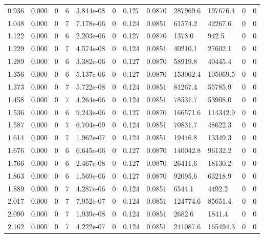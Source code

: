 \documentclass[preview]{standalone}
\begin{document}
{{\begin{tabular}{L{1.2cm}C{1.2cm} C{0.3cm}C{0.5cm} C{1.4cm}C{1.4cm} C{1.4cm}C{1.4cm} C{1.6cm}C{1.6cm} C{1.6cm}C{1.6cm}}
  0.936  &  0.000  & 0     &  6 &  3.844e-08  & 0  &  0.127&   0.0870& 287969.6 & 197676.4   &  0 & 0  \\ 
  1.048  &  0.000  & 0     &  7 &  7.178e-06  & 0  &  0.124&   0.0851& 61574.2 & 42267.6   &  0 & 0  \\ 
  1.122  &  0.000  & 0     &  6 &  2.203e-06  & 0  &  0.127&   0.0870& 1373.0 & 942.5   &  0 & 0  \\ 
  1.229  &  0.000  & 0     &  7 &  4.574e-08  & 0  &  0.124&   0.0851& 40210.1 & 27602.1   &  0 & 0  \\ 
  1.289  &  0.000  & 0     &  6 &  3.382e-06  & 0  &  0.127&   0.0870& 58919.8 & 40445.4   &  0 & 0  \\ 
  1.356  &  0.000  & 0     &  6 &  5.137e-06  & 0  &  0.127&   0.0870& 153062.4 & 105069.5   &  0 & 0  \\ 
  1.373  &  0.000  & 0     &  7 &  5.722e-08  & 0  &  0.124&   0.0851& 81267.4 & 55785.9   &  0 & 0  \\ 
  1.458  &  0.000  & 0     &  7 &  4.264e-06  & 0  &  0.124&   0.0851& 78531.7 & 53908.0   &  0 & 0  \\ 
  1.536  &  0.000  & 0     &  6 &  9.243e-06  & 0  &  0.127&   0.0870& 166571.6 & 114342.9   &  0 & 0  \\ 
  1.587  &  0.000  & 0     &  7 &  6.704e-09  & 0  &  0.124&   0.0851& 70831.7 & 48622.3   &  0 & 0  \\ 
  1.614  &  0.000  & 0     &  7 &  1.962e-07  & 0  &  0.124&   0.0851& 19446.8 & 13349.3   &  0 & 0  \\ 
  1.676  &  0.000  & 0     &  6 &  6.645e-06  & 0  &  0.127&   0.0870& 140042.8 & 96132.2   &  0 & 0  \\ 
  1.766  &  0.000  & 0     &  6 &  2.467e-08  & 0  &  0.127&   0.0870& 26411.6 & 18130.2   &  0 & 0  \\ 
  1.863  &  0.000  & 0     &  6 &  1.569e-06  & 0  &  0.127&   0.0870& 92095.6 & 63218.9   &  0 & 0  \\ 
  1.889  &  0.000  & 0     &  7 &  4.287e-06  & 0  &  0.124&   0.0851& 6544.1 & 4492.2   &  0 & 0  \\ 
  2.017  &  0.000  & 0     &  7 &  7.952e-07  & 0  &  0.124&   0.0851& 124774.6 & 85651.4   &  0 & 0  \\ 
  2.090  &  0.000  & 0     &  7 &  1.939e-08  & 0  &  0.124&   0.0851& 2682.6 & 1841.4   &  0 & 0  \\ 
  2.162  &  0.000  & 0     &  7 &  4.222e-07  & 0  &  0.124&   0.0851& 241087.6 & 165494.3   &  0 & 0  \\ 

\end{tabular}}}
\end{document}
